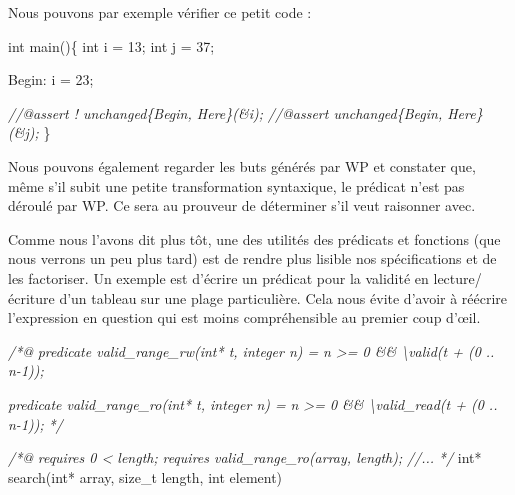 \documentclass[12pt,francais,]{scrbook}
\newenvironment{Shaded}{}{}
\newcommand{\DataTypeTok}[1]{\textcolor[rgb]{0.56,0.13,0.00}{{#1}}}
\newcommand{\DecValTok}[1]{\textcolor[rgb]{0.25,0.63,0.44}{{#1}}}
\newcommand{\CommentTok}[1]{\textcolor[rgb]{0.38,0.63,0.69}{\textit{{#1}}}}
\newcommand{\NormalTok}[1]{{#1}}
\begin{document}
Nous pouvons par exemple vérifier ce petit code :

\begin{footnotesize}\begin{Shaded}
\begin{Highlighting}[]
\DataTypeTok{int} \NormalTok{main()\{}
  \DataTypeTok{int} \NormalTok{i = }\DecValTok{13}\NormalTok{;}
  \DataTypeTok{int} \NormalTok{j = }\DecValTok{37}\NormalTok{;}

 \NormalTok{Begin:}
  \NormalTok{i = }\DecValTok{23}\NormalTok{;}
 
  \CommentTok{//@assert ! unchanged\{Begin, Here\}(&i);}
  \CommentTok{//@assert   unchanged\{Begin, Here\}(&j);}
\NormalTok{\}}
\end{Highlighting}
\end{Shaded}\end{footnotesize}

Nous pouvons également regarder les buts générés par WP et constater
que, même s'il subit une petite transformation syntaxique, le prédicat
n'est pas déroulé par WP. Ce sera au prouveur de déterminer s'il veut
raisonner avec.

Comme nous l'avons dit plus tôt, une des utilités des prédicats et
fonctions (que nous verrons un peu plus tard) est de rendre plus lisible
nos spécifications et de les factoriser. Un exemple est d'écrire un
prédicat pour la validité en lecture/écriture d'un tableau sur une plage
particulière. Cela nous évite d'avoir à réécrire l'expression en
question qui est moins compréhensible au premier coup d'œil.

\begin{footnotesize}\begin{Shaded}
\begin{Highlighting}[]
\CommentTok{/*@}
\CommentTok{  predicate valid_range_rw(int* t, integer n) =}
\CommentTok{    n >= 0 && \textbackslash{}valid(t + (0 .. n-1));}

\CommentTok{  predicate valid_range_ro(int* t, integer n) =}
\CommentTok{    n >= 0 && \textbackslash{}valid_read(t + (0 .. n-1));}
\CommentTok{*/}

\CommentTok{/*@}
\CommentTok{  requires 0 < length;}
\CommentTok{  requires valid_range_ro(array, length);}
\CommentTok{  //...}
\CommentTok{*/}
\DataTypeTok{int}\NormalTok{* search(}\DataTypeTok{int}\NormalTok{* array, size_t length, }\DataTypeTok{int} \NormalTok{element)}
\end{Highlighting}
\end{Shaded}\end{footnotesize}
\end{document}
